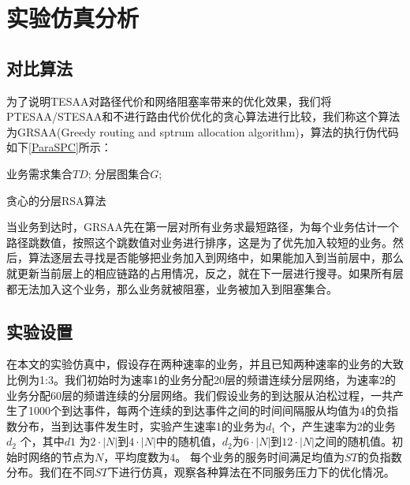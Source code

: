 \section{实验仿真分析}
\subsection{对比算法}
为了说明TESAA对路径代价和网络阻塞率带来的优化效果，我们将PTESAA/STESAA和不进行路由代价优化的贪心算法进行比较，我们称这个算法为GRSAA(Greedy routing and sptrum allocation algorithm)，算法的执行伪代码如下\ref{ParaSPC}所示：
\begin{algorithm}[t]
\begin{algorithmic}[1]
\Require
业务需求集合$TD$;
分层图集合$G$;
\EndIf
\EndFor
{}
\EndIf
\EndFor
\EndFor
\EndFor
\end{algorithmic}
\caption{{贪心的分层RSA算法}}
\label{ParaSPC}
\end{algorithm}

当业务到达时，GRSAA先在第一层对所有业务求最短路径，为每个业务估计一个路径跳数值，按照这个跳数值对业务进行排序，这是为了优先加入较短的业务。然后，算法逐层去寻找是否能够把业务加入到网络中，如果能加入到当前层中，那么就更新当前层上的相应链路的占用情况，反之，就在下一层进行搜寻。如果所有层都无法加入这个业务，那么业务就被阻塞，业务被加入到阻塞集合。
\subsection{实验设置}
在本文的实验仿真中，假设存在两种速率的业务，并且已知两种速率的业务的大致比例为1:3。我们初始时为速率1的业务分配20层的频谱连续分层网络，为速率2的业务分配60层的频谱连续的分层网络。我们假设业务的到达服从泊松过程，一共产生了1000个到达事件，每两个连续的到达事件之间的时间间隔服从均值为4的负指数分布，当到达事件发生时，实验产生速率1的业务为$d_1$ 个，产生速率为2的业务$d_2$ 个，其中$d1$ 为$2 \cdot |N|$到$4 \cdot|N|$中的随机值，$d_2$为$6 \cdot |N|$到$12 \cdot |N|$之间的随机值。初始时网络的节点为$N$，平均度数为$4$。 每个业务的服务时间满足均值为$ST$的负指数分布。我们在不同$ST$下进行仿真，观察各种算法在不同服务压力下的优化情况。


